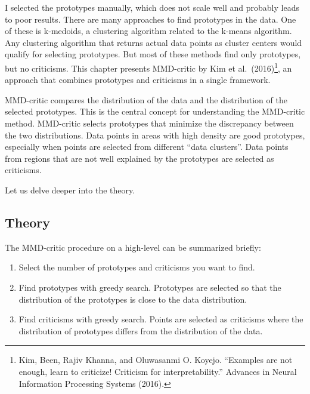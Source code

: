 \documentclass[
  10pt,
]{scrbook}
\providecommand{\tightlist}{%
  \setlength{\itemsep}{0pt}\setlength{\parskip}{0pt}}
\begin{document}
I selected the prototypes manually, which does not scale well and probably leads to poor results.
There are many approaches to find prototypes in the data.
One of these is k-medoids, a clustering algorithm related to the k-means algorithm.
Any clustering algorithm that returns actual data points as cluster centers would qualify for selecting prototypes.
But most of these methods find only prototypes, but no criticisms.
This chapter presents MMD-critic by Kim et al.~(2016)\footnote{Kim, Been, Rajiv Khanna, and Oluwasanmi O. Koyejo. ``Examples are not enough, learn to criticize! Criticism for interpretability.'' Advances in Neural Information Processing Systems (2016).}, an approach that combines prototypes and criticisms in a single framework.

MMD-critic compares the distribution of the data and the distribution of the selected prototypes.
This is the central concept for understanding the MMD-critic method.
MMD-critic selects prototypes that minimize the discrepancy between the two distributions.
Data points in areas with high density are good prototypes, especially when points are selected from different ``data clusters''.
Data points from regions that are not well explained by the prototypes are selected as criticisms.

Let us delve deeper into the theory.

\hypertarget{theory-5}{%
\subsection{Theory}\label{theory-5}}

The MMD-critic procedure on a high-level can be summarized briefly:

\begin{enumerate}
\def\labelenumi{\arabic{enumi}.}
\tightlist
\item
  Select the number of prototypes and criticisms you want to find.
\item
  Find prototypes with greedy search.
  Prototypes are selected so that the distribution of the prototypes is close to the data distribution.
\item
  Find criticisms with greedy search.
  Points are selected as criticisms where the distribution of prototypes differs from the distribution of the data.
\end{enumerate}
\end{document}
